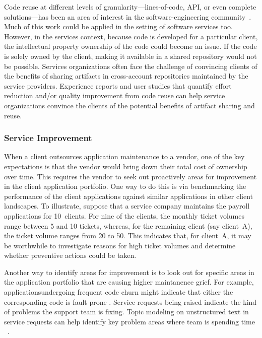 Code reuse at different levels of granularity---lines-of-code, API, or even
complete solutions---has been an area of interest in the software-engineering
community~\cite{Holmes:2013,Reiss:2009}. Much of this work could be applied in
the setting of software services too. However, in the services context, because
code is developed for a particular client, the intellectual property ownership
of the code could become an issue. If the code is solely owned by the client,
making it available in a shared repository would not be possible. Services
organizations often face the challenge of convincing clients of the benefits of
sharing artifacts in cross-account repositories maintained by the service
providers. Experience reports and user studies that quantify effort reduction
and/or quality improvement from code reuse can help service organizations
convince the clients of the potential benefits of artifact sharing and reuse.

\subsubsection{Service Improvement}

When a client outsources application maintenance to a vendor, one of the key
expectations is that the vendor would bring down their total cost of ownership
over time. This requires the vendor to seek out proactively areas for
improvement in the client application portfolio. One way to do this is via
benchmarking the performance of the client applications against similar
applications in other client landscapes. To illustrate, suppose that a service
company maintains the payroll applications for 10~clients. For nine of the
clients, the monthly ticket volumes range between 5 and 10 tickets, whereas, for
the remaining client (say client~A), the ticket volume ranges from 20 to
50. This indicates that, for client~A, it may be worthwhile to investigate
reasons for high ticket volumes and determine whether preventive actions could
be taken. 

Another way to identify areas for improvement is to look out for specific areas in the application portfolio that are causing higher maintanence grief. For example, applicationsundergoing frequent code churn might indicate that either the corresponding code is fault prone \cite{Nag2005}. Service requests being raised indicate the kind of problems the support team is fixing. Topic modeling on unstructured text in service requests can help identify key problem areas where team is spending time ~\cite{mani2014}. 

